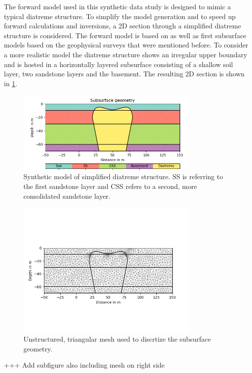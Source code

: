 The forward model used in this synthetic data study is designed to mimic a typical diatreme structure. To simplify the model generation and to speed up forward calculations and inversions, a 2D section through a simplified diatreme structure is considered. The forward model is based on \citet{white2011maar} as well as first subsurface models based on the geophysical surveys that were mentioned before. To consider a more realistic model the diatreme structure shows an irregular upper boundary and is hosted in a horizontally layered subsurface consisting of a shallow soil layer, two sandstone layers and the basement. The resulting 2D section is shown in \ref{figure:synthetic_model}.

\begin{figure}[H]
\centering
\noindent\includegraphics[width=0.8\textwidth]{Figures/Model.png}
\caption[Synthetic model of simplified diatreme structure]{Synthetic model of simplified diatreme structure. SS is referring to the first sandstone layer and CSS refers to a second, more consolidated sandstone layer.}
\label{figure:synthetic_model}
\end{figure}

\begin{figure}[H]
\centering
\noindent\includegraphics[width=0.8\textwidth]{Figures/Mesh.png}
\caption[Unstructired mesh]{Unstructured, triangular mesh used to discrtize the subsurface geometry.}
\label{figure:mesh}
\end{figure}

+++ Add subfigure also including mesh on right side